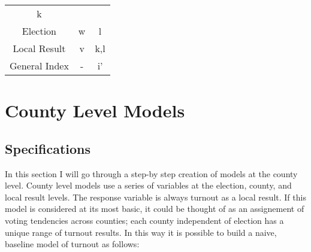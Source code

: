 \documentclass[12pt,twoside]{reedthesis}
\begin{document}
\begin{longtable}[]{@{}ccc@{}}
\begin{minipage}[t]{0.15\columnwidth}
  k\strut
  \end{minipage}\tabularnewline
  \begin{minipage}[t]{0.27\columnwidth}\centering\strut
  Election\strut
  \end{minipage} & \begin{minipage}[t]{0.20\columnwidth}\centering\strut
  w\strut
  \end{minipage} & \begin{minipage}[t]{0.15\columnwidth}\centering\strut
  l\strut
  \end{minipage}\tabularnewline
  \begin{minipage}[t]{0.27\columnwidth}\centering\strut
  Local Result\strut
  \end{minipage} & \begin{minipage}[t]{0.20\columnwidth}\centering\strut
  v\strut
  \end{minipage} & \begin{minipage}[t]{0.15\columnwidth}\centering\strut
  k,l\strut
  \end{minipage}\tabularnewline
  \begin{minipage}[t]{0.27\columnwidth}\centering\strut
  General Index\strut
  \end{minipage} & \begin{minipage}[t]{0.20\columnwidth}\centering\strut
  -\strut
  \end{minipage} & \begin{minipage}[t]{0.15\columnwidth}\centering\strut
  i'\strut
  \end{minipage}\tabularnewline
  \bottomrule
  \end{longtable}
  
  \section{County Level Models}\label{county-level-models}
  
  \subsection{Specifications}\label{specifications}
  
  In this section I will go through a step-by step creation of models at
  the county level. County level models use a series of variables at the
  election, county, and local result levels. The response variable is
  always turnout as a local result. If this model is considered at its
  most basic, it could be thought of as an assignement of voting
  tendencies across counties; each county independent of election has a
  unique range of turnout results. In this way it is possible to build a
  naive, baseline model of turnout as follows:
  
\end{document}
